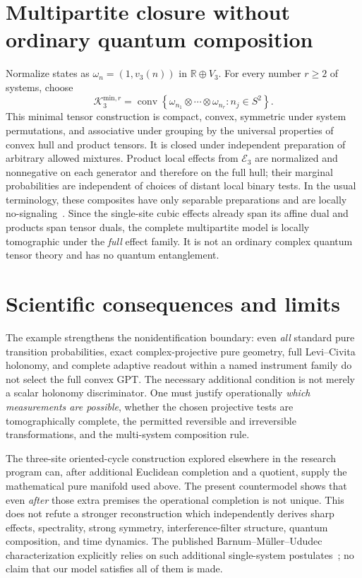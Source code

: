 \documentclass[10.5pt,letterpaper]{article}
\newcommand{\RR}{\mathbb{R}}
\newcommand{\KK}{\mathcal{K}}
\newcommand{\conv}{\operatorname{conv}}
\newcommand{\eff}{\mathcal{E}}
\begin{document}
\section{Multipartite closure without ordinary quantum composition}
Normalize states as $\omega_n=(1,v_3(n))$ in $\RR\oplus V_3$. For every number $r\ge2$ of systems, choose
\begin{equation}\label{eq:min}
\KK_3^{\mathrm{min},r}=\conv\left\{\omega_{n_1}\otimes\cdots\otimes\omega_{n_r}: n_j\in S^2\right\}.
\end{equation}
This minimal tensor construction is compact, convex, symmetric under system permutations, and associative under grouping by the universal properties of convex hull and product tensors. It is closed under independent preparation of arbitrary allowed mixtures. Product local effects from $\eff_3$ are normalized and nonnegative on each generator and therefore on the full hull; their marginal probabilities are independent of choices of distant local binary tests. In the usual terminology, these composites have only separable preparations and are locally no-signaling~\cite{barrett,eftaxias}. Since the single-site cubic effects already span its affine dual and products span tensor duals, the complete multipartite model is locally tomographic under the \emph{full} effect family. It is not an ordinary complex quantum tensor theory and has no quantum entanglement.

\section{Scientific consequences and limits}
The example strengthens the nonidentification boundary: even \emph{all} standard pure transition probabilities, exact complex-projective pure geometry, full Levi--Civita holonomy, and complete adaptive readout within a named instrument family do not select the full convex GPT. The necessary additional condition is not merely a scalar holonomy discriminator. One must justify operationally \emph{which measurements are possible}, whether the chosen projective tests are tomographically complete, the permitted reversible and irreversible transformations, and the multi-system composition rule.

The three-site oriented-cycle construction explored elsewhere in the research program can, after additional Euclidean completion and a quotient, supply the mathematical pure manifold used above. The present countermodel shows that even \emph{after} those extra premises the operational completion is not unique. This does not refute a stronger reconstruction which independently derives sharp effects, spectrality, strong symmetry, interference-filter structure, quantum composition, and time dynamics. The published Barnum--M\"uller--Ududec characterization explicitly relies on such additional single-system postulates~\cite{bmu}; no claim that our model satisfies all of them is made.
\end{document}
